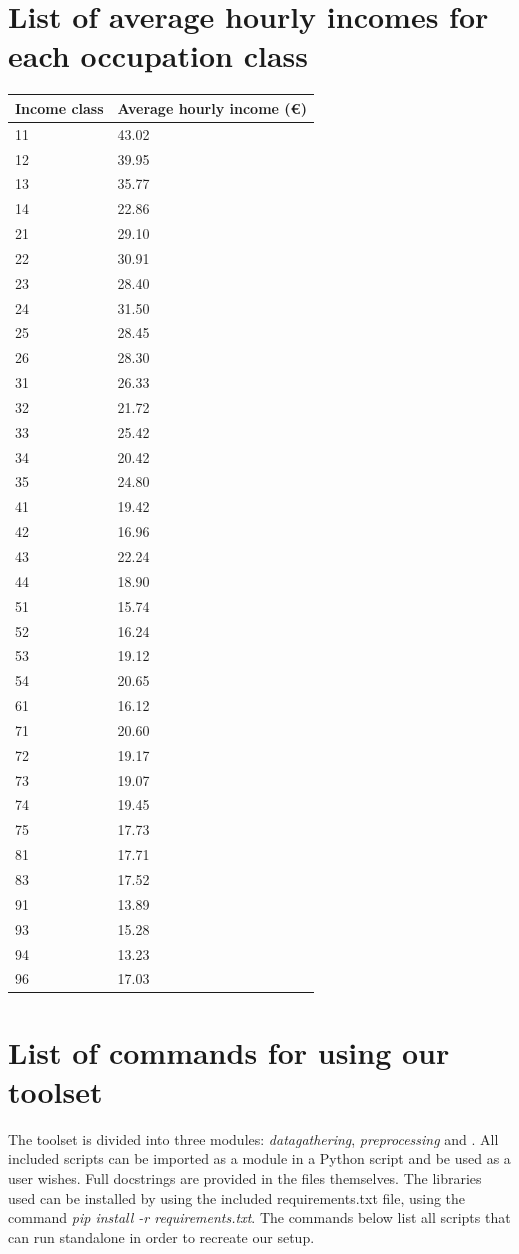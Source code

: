 \documentclass[
10pt, %
a4paper, %
oneside, %
headinclude,footinclude, %
] {book}%
\begin{document}
\section{List of average hourly incomes for each occupation class}
\begin{table}[h]
\label{appendix:income}
\begin{tabular}{@{}ll@{}}
\toprule
Income class & Average hourly income (\euro) \\ \midrule
11 & 43.02 \\
12 & 39.95 \\
13 & 35.77 \\
14 & 22.86 \\
21 & 29.10 \\
22 & 30.91 \\
23 & 28.40 \\
24 & 31.50 \\
25 & 28.45 \\
26 & 28.30 \\
31 & 26.33 \\
32 & 21.72 \\
33 & 25.42 \\
34 & 20.42 \\
35 & 24.80 \\
41 & 19.42 \\
42 & 16.96 \\
43 & 22.24 \\
44 & 18.90 \\
51 & 15.74 \\
52 & 16.24 \\
53 & 19.12 \\
54 & 20.65 \\
61 & 16.12 \\
71 & 20.60 \\
72 & 19.17 \\
73 & 19.07 \\
74 & 19.45 \\
75 & 17.73 \\
81 & 17.71 \\
83 & 17.52 \\
91 & 13.89 \\
93 & 15.28 \\
94 & 13.23 \\
96 & 17.03 \\ \bottomrule
\end{tabular}
\end{table}

\newpage
\section{List of commands for using our toolset}
The toolset is divided into three modules: \textit{datagathering}, \textit{preprocessing} and . All included scripts can be imported as a module in a Python script and be used as a user wishes. Full docstrings are provided in the files themselves. The libraries used can be installed by using the included requirements.txt file, using the command \textit{pip install -r requirements.txt}. The commands below list all scripts that can run standalone in order to recreate our setup.
\end{document}

